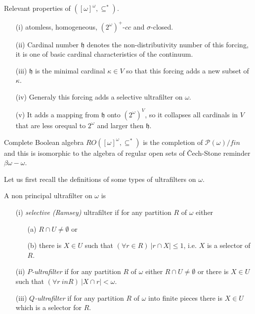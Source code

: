 \smallskip

Relevant properties of $([\omega]^\omega,\subseteq^*)$.
\begin{itemize}
 \item[(i)] atomless, homogeneous, $(2^\omega)^+$-$cc$ and $\sigma$-closed.
 \item[(ii)] Cardinal number $\mathfrak h$ denotes the non-distributivity
	number of this forcing, it is one  of basic cardinal characteristics
	of the continuum.
 \item[(iii)] $\mathfrak h$ is the minimal cardinal $\kappa \in V$ so that
	this forcing adds a new subset of $\kappa$.
 \item[(iv)] Generaly this forcing adds a selective ultrafilter on $\omega$.
 \item[(v)] It adds a mapping from $\mathfrak h$ onto $(2^\omega)^V$, so
	it collapses all cardinals in $V$ that are less orequal to $2^\omega$
	and larger then $\mathfrak h$.
 \end{itemize}

Complete Boolean algebra $RO([\omega]^\omega,\subseteq^*)$ is the completion
of $\mathcal P(\omega) / fin$ and this is isomorphic to the algebra of regular
open sets of \v Cech-Stone reminder $\beta \omega - \omega$.

\medskip

Let us first recall the definitions of some types of ultrafilters on $\omega$.

\begin{definition}
 A non principal ultrafilter on $\omega$ is
\begin{itemize}
 \item[(i)] \emph{selective (Ramsey)} ultrafilter if for any partition
	$R$ of $\omega$ either
	\begin{itemize}
	\item[(a)] $R \cap U \not = \emptyset$ or
	\item[(b)] there is $X \in U$ such that $(\forall r \in R) \ |r \cap X| \leq 1$,
		i.e. $X$ is a selector of $R$.
	\end{itemize}
 \item[(ii)] \emph{$P$-ultrafilter} if for any partition $R$ of $\omega$
	either $R \cap U \not = \emptyset$  or there is $X \in U$  such that
	$(\forall r \ in R) \ |X \cap r | < \omega$.
 \item[(iii)] \emph{$Q$-ultrafilter} if for any partition $R$ of $\omega$
	into finite pieces there is $X \in U $ which is a selector for $R$.
\end{itemize}
\end{definition}

